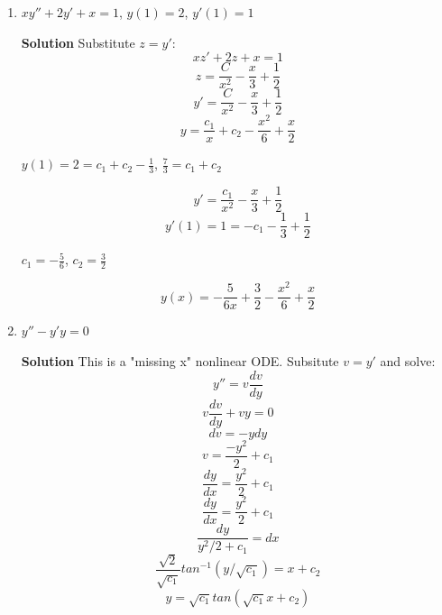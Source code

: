 \documentclass[letterpaper, fontsize=11pt]{scrartcl}
\numberwithin{equation}{section} %
\numberwithin{figure}{section} %
\numberwithin{table}{section} %
\begin{document}
\begin{enumerate}
\item $x y''  + 2y' + x  = 1$, $y(1) = 2$, $y'(1) = 1$ \par
\textbf{Solution} \newline
Substitute $z = y'$:
$$ xz' + 2z + x = 1$$
$$ z = \frac{C}{x^2} - \frac{x}{3} + \frac{1}{2}$$
$$ y' = \frac{C}{x^2} - \frac{x}{3} + \frac{1}{2}$$
$$ y = \frac{c_1}{x} + c_2 - \frac{x^2}{6} + \frac{x}{2}$$
\begin{center} $ y(1) = 2 = c_1 + c_2 - \frac{1}{3}$, $\frac{7}{3} = c_1 + c_2$ \end{center}
$$y' = \frac{c_1}{x^2} - \frac{x}{3} + \frac{1}{2}$$
$$y'(1) = 1 = -c_1 - \frac{1}{3} + \frac{1}{2}$$
\begin{center} $c_1 = -\frac{5}{6}$, $c_2 = \frac{3}{2}$\end{center}
$$y(x) = -\frac{5}{6x} + \frac{3}{2} - \frac{x^2}{6} + \frac{x}{2}$$

\item $y'' - y'y = 0$\par
\textbf{Solution} \newline
This is a "missing x" nonlinear ODE. Subsitute $v = y'$ and solve:
$$y'' = v\frac{dv}{dy}$$
$$v\frac{dv}{dy} + vy = 0$$
$$dv = -y dy$$
$$v = \frac{-y^2}{2} + c_1$$
$$\frac{dy}{dx} = \frac{y^2}{2}+c_1$$
$$\frac{dy}{dx} = \frac{y^2}{2}+c_1$$
$$\frac{dy}{y^2/2 + c_1} = dx$$
$$\frac{\sqrt{2}}{\sqrt{c_1}}tan^{-1}(y/\sqrt{c_1}) = x + c_2$$
$$y = \sqrt{c_1} tan(\sqrt{c_1}x + c_2)$$




\end{enumerate}
\end{document}
